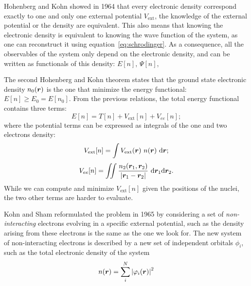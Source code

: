 \documentclass[thesis]{subfiles}
\begin{document}
Hohenberg and Kohn showed in 1964 that every electronic density correspond
exactly to one and only one external potential $V_\text{ext}$, \ie the knowledge
of the external potential or the density are equivalent. This also means that
knowing the electronic density is equivalent to knowing the wave function of the
system, as one can reconstruct it using equation~\eqref{eq:schrodinger}. As a
consequence, all the observables of the system only depend on the electronic
density, and can be written as functionals of this density: $E[n]$, $\Psi[n]$,
\etc

The second Hohenberg and Kohn theorem states that the ground state electronic
density $n_0(\bm{r})$ is the one that minimize the energy functional: $E[n] \geq
E_0 = E[n_0]$. From the previous relations, the total energy functional contains
three terms:
\[E[n] = T[n] + V_\text{ext}[n] + V_{ee}[n];\]
where the potential terms can be expressed as integrals of the one and two
electrons density:
\[ V_\text{ext}[n] = \int V_\text{ext}(\bm{r}) \ n(\bm{r}) \ \text{d} \bm{r};\]
\[ V_{ee}[n] = \iint \frac{n_2(\bm{r}_1, \bm{r}_2)}{|\bm{r}_1 - \bm{r}_2|} \ \text{d} \bm{r}_1 \text{d} \bm{r}_2.\]
While we can compute and minimize $V_\text{ext}[n]$ given the positions of the
nuclei, the two other terms are harder to evaluate.

Kohn and Sham reformulated the problem in 1965 by considering a set of
\emph{non-interacting} electrons evolving in a specific external potential, such
as the density arising from these electrons is the same as the one we look for.
The new system of non-interacting electrons is described by a new set of
independent orbitals $\phi_i$, such as the total electronic density of the system
\[n(\bm{r}) = \sum_i^N \left| \varphi_i(\bm{r}) \right|^2\]
\end{document}
